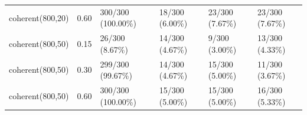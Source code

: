\begin{longtable}{p{27mm}p{9mm}p{29mm}p{29mm}p{29mm}p{29mm}}
coherent\newline (800,20) & 0.60 & 300/300 (100.00\%)\newline [98.78, 100.00] & 18/300 (6.00\%)\newline [3.59, 9.32] & 23/300 (7.67\%)\newline [4.92, 11.28] & 23/300 (7.67\%)\newline [4.92, 11.28] \\
coherent\newline (800,50) & 0.15 & 26/300 (8.67\%)\newline [5.74, 12.44] & 14/300 (4.67\%)\newline [2.57, 7.71] & 9/300 (3.00\%)\newline [1.38, 5.62] & 13/300 (4.33\%)\newline [2.33, 7.30] \\
coherent\newline (800,50) & 0.30 & 299/300 (99.67\%)\newline [98.16, 99.99] & 14/300 (4.67\%)\newline [2.57, 7.71] & 15/300 (5.00\%)\newline [2.83, 8.11] & 11/300 (3.67\%)\newline [1.84, 6.47] \\
coherent\newline (800,50) & 0.60 & 300/300 (100.00\%)\newline [98.78, 100.00] & 15/300 (5.00\%)\newline [2.83, 8.11] & 15/300 (5.00\%)\newline [2.83, 8.11] & 16/300 (5.33\%)\newline [3.08, 8.52] \\
\bottomrule
\end{longtable}
\endgroup
{}

